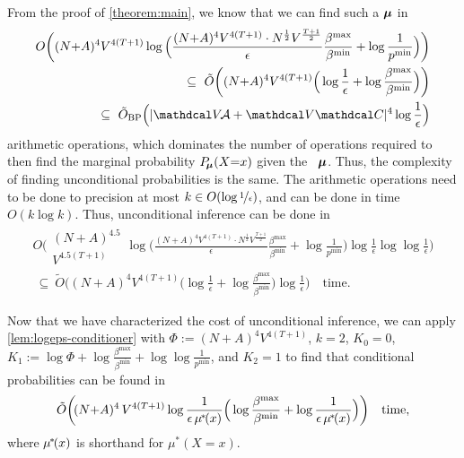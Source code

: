 \begin{lproof}
        From the proof of \cref{theorem:main}, we know that we can find
        such a $\boldsymbol\mu$ 
        in
        \begin{align*}
            O\bigg( 
                (N{+}A)^4 V^{4(T+1)}
                \log \Big( \frac{(N{+}A)^4 V^{4(T+1)}\cdot N^{\frac12} V^{\frac{T+1}{2}}}{\epsilon} \frac{\beta^{\max}}{\beta^{\min}} + \log \frac1{p^{\min}} \Big) 
            \bigg) \\
            ~\subseteq~
            \tilde O\bigg( 
                (N{+}A)^4 V^{4(T+1)}
                \Big(
                \log \frac1\epsilon + \log \frac{\beta^{\max}}{\beta^{\min}}\Big) 
            \bigg) \\
            ~\subseteq~
            \tilde O_{\text{BP}}\Big(|\V\!\Ar + \V \C|^{4}\log \frac{1}{\epsilon} \Big)
        \end{align*}
        arithmetic operations,
        which dominates the number of operations required to then find the marginal probability $P_{\!\boldsymbol\mu}(X{=}x)$ given the \actree\ $\boldsymbol\mu$.
        Thus, the complexity of finding unconditional probabilities is the same. 
        The arithmetic operations need to be done to precision at most $k \in O(\log\nicefrac1\epsilon)$, and can be done in time $O(k\log k)$. 
        Thus, unconditional inference can be done in 
        \begin{align*}
            O\bigg( 
                \begin{matrix}{}(N{+}A)^{4.5} \\ V^{4.5(T+1)}\end{matrix}
                \log \Big( \frac{(N{+}A)^4 V^{4(T+1)}\cdot N^{\frac12} V^{\frac{T+1}{2}}}{\epsilon} \frac{\beta^{\max}}{\beta^{\min}} + \log \frac1{p^{\min}} \Big) 
                \log\frac{1}{\epsilon} \log\log\frac{1}{\epsilon}
            \bigg) \\
            ~\subseteq~
            \tilde O\bigg( 
                (N{+}A)^4 V^{4(T+1)}
                \Big(
                \log \frac1\epsilon + \log \frac{\beta^{\max}}{\beta^{\min}}\Big) 
                \log \frac1\epsilon
            \bigg)
            \quad\text{time}. 
        \end{align*}
        
        \def\mustar{\mu^{\mskip-2mu*\!}}
        Now that we have characterized the cost of unconditional inference, we can apply \cref{lem:logeps-conditioner} with $\Phi := (N+A)^4 V^{4(T+1)}$,
        $k = 2$,
        $K_0 = 0$, 
        $K_1 := \log \Phi + \log \frac{\beta^{\max}}{\beta^{\min}} + \log \log \frac1{p^{\min}}$, 
        and
        $K_2 = 1$
        to find that conditional probabilities can be found in
        \begin{align*}
            \tilde O \bigg(\! (N{+}A)^4\,V^{4(T+1)} 
            \log \frac1{\epsilon\,\mustar(x)}
            \Big(
                  \log \frac{\beta^{\max}}{\beta^{\min}} 
                   + \log \frac1{\epsilon\, \mustar(x)} 
             \Big)\bigg) 
            \quad \text{time},
        \end{align*}
        where $\mustar(x)$ is shorthand for
        $\mu^*(X{=}x)$. 
    \end{lproof}
        

